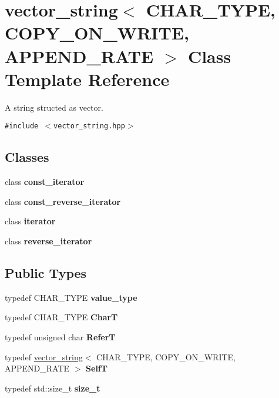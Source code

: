 \hypertarget{classvector__string}{
\section{vector\_\-string$<$ CHAR\_\-TYPE, COPY\_\-ON\_\-WRITE, APPEND\_\-RATE $>$ Class Template Reference}
\label{classvector__string}
}
A string structed as vector.  


{\tt \#include $<$vector\_\-string.hpp$>$}

\subsection*{Classes}
\begin{CompactItemize}
\item 
class \textbf{const\_\-iterator}
\item 
class \textbf{const\_\-reverse\_\-iterator}
\item 
class \textbf{iterator}
\item 
class \textbf{reverse\_\-iterator}
\end{CompactItemize}
\subsection*{Public Types}
\begin{CompactItemize}
\item 
\hypertarget{classvector__string_5e02bddde6472706bc0fe7c738669b2d}{
typedef CHAR\_\-TYPE \textbf{value\_\-type}}
\label{classvector__string_5e02bddde6472706bc0fe7c738669b2d}

\item 
\hypertarget{classvector__string_c9d60c5752e8788daedc0e2bf6455e73}{
typedef CHAR\_\-TYPE \textbf{CharT}}
\label{classvector__string_c9d60c5752e8788daedc0e2bf6455e73}

\item 
\hypertarget{classvector__string_067aa7552dbc93951c34f4fa278b3722}{
typedef unsigned char \textbf{ReferT}}
\label{classvector__string_067aa7552dbc93951c34f4fa278b3722}

\item 
\hypertarget{classvector__string_822871685449d8779a416b9a65d4890a}{
typedef \hyperlink{classvector__string}{vector\_\-string}$<$ CHAR\_\-TYPE, COPY\_\-ON\_\-WRITE, APPEND\_\-RATE $>$ \textbf{SelfT}}
\label{classvector__string_822871685449d8779a416b9a65d4890a}

\item 
\hypertarget{classvector__string_c0ff5152900c1046a3e09496f4534599}{
typedef std::size\_\-t \textbf{size\_\-t}}
\label{classvector__string_c0ff5152900c1046a3e09496f4534599}

\end{CompactItemize}
